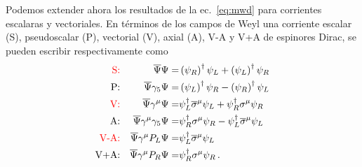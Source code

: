 \begin{frame}
Podemos extender ahora los resultados de la ec.~\eqref{eq:mwd} para corrientes escalaras y vectoriales. En términos de los campos de Weyl una corriente escalar (S), pseudoscalar (P), vectorial (V), axial (A),  V-A y V+A de espinores Dirac, se pueden escribir respectivamente como
\begin{align}
\label{eq:8}
\color{red}\text{S:} &&  \overline{\Psi}\Psi =& \left( \psi_R \right)^\dagger \psi_L+\left( \psi_L \right)^{\dagger}\psi_R \nonumber\\
\text{P:} &&  \overline{\Psi}\gamma_5\Psi =& \left( \psi_L \right)^{\dagger}\psi_R-\left( \psi_R \right)^\dagger \psi_L \nonumber\\
\color{red}\text{V:}& &  \overline{\Psi}\gamma^{\mu}\Psi=& \psi_L^{\dagger}\overline{\sigma}^{\mu}\psi_L+\psi_R^{\dagger}\sigma^{\mu}\psi_{R}\nonumber\\
\text{A:}& &  \overline{\Psi}\gamma^{\mu}\gamma_5\Psi=&\psi_R^{\dagger}\sigma^{\mu}\psi_{R}- \psi_L^{\dagger}\overline{\sigma}^{\mu}\psi_L\nonumber\\
\color{red}\text{V-A:} && \overline{\Psi}\gamma^{\mu}P_L\Psi=& \psi_L^{\dagger}\overline{\sigma}^{\mu}\psi_L\nonumber\\
\text{V+A:} && \overline{\Psi}\gamma^{\mu}P_R\Psi=& \psi_R^{\dagger}{\sigma}^{\mu}\psi_R\,.
\end{align}



\end{frame}
